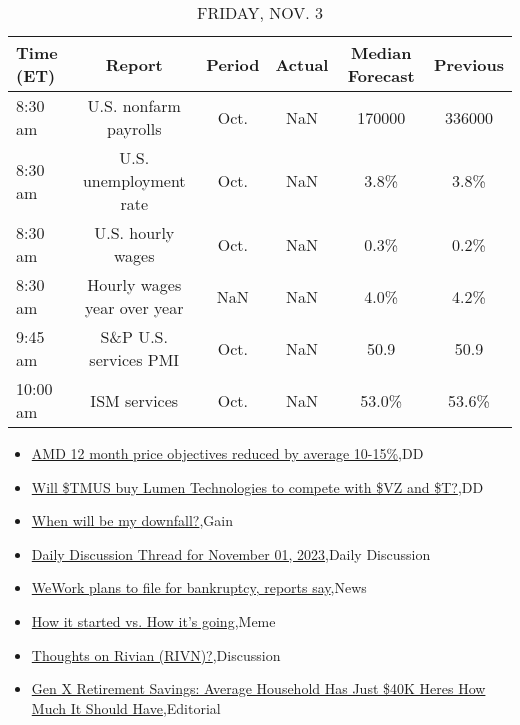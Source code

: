 \documentclass{article}%
\begin{document}
%


\begin{table}[htbp]%
\caption{FRIDAY, NOV. 3}%
\centering%
\begin{adjustbox}{width=1\textwidth}%
\begin{tabular}{lccccc}
\toprule
Time (ET) &                      Report & Period & Actual & Median Forecast & Previous \\
\midrule
  8:30 am &       U.S. nonfarm payrolls &   Oct. &    NaN &          170000 &   336000 \\
  8:30 am &      U.S. unemployment rate &   Oct. &    NaN &            3.8\% &     3.8\% \\
  8:30 am &           U.S. hourly wages &   Oct. &    NaN &            0.3\% &     0.2\% \\
  8:30 am & Hourly wages year over year &    NaN &    NaN &            4.0\% &     4.2\% \\
  9:45 am &       S\&P U.S. services PMI &   Oct. &    NaN &            50.9 &     50.9 \\
 10:00 am &                ISM services &   Oct. &    NaN &           53.0\% &    53.6\% \\
\bottomrule
\end{tabular}
%
\end{adjustbox}%
\end{table}

%
\begin{itemize}%
\item%
\href{https://reddit.com/r/wallstreetbets/comments/17lba3a/amd\_12\_month\_price\_objectives\_reduced\_by\_average/}{AMD 12 month price objectives reduced by average 10-15\%},DD%
\item%
\href{https://reddit.com/r/wallstreetbets/comments/17la1r1/will\_tmus\_buy\_lumen\_technologies\_to\_compete\_with/}{Will \$TMUS buy Lumen Technologies to compete with \$VZ and \$T?},DD%
\item%
\href{https://reddit.com/r/wallstreetbets/comments/17l9htl/when\_will\_be\_my\_downfall/}{When will be my downfall?},Gain%
\item%
\href{https://reddit.com/r/wallstreetbets/comments/17l8ny8/daily\_discussion\_thread\_for\_november\_01\_2023/}{Daily Discussion Thread for November 01, 2023},Daily Discussion%
\item%
\href{https://reddit.com/r/wallstreetbets/comments/17l6n4t/wework\_plans\_to\_file\_for\_bankruptcy\_reports\_say/}{WeWork plans to file for bankruptcy, reports say},News%
\item%
\href{https://reddit.com/r/wallstreetbets/comments/17l5qqe/how\_it\_started\_vs\_how\_its\_going/}{How it started vs. How it's going},Meme%
\item%
\href{https://reddit.com/r/StockMarket/comments/17kt86a/thoughts\_on\_rivian\_rivn/}{Thoughts on Rivian (RIVN)?},Discussion%
\item%
\href{https://reddit.com/r/Economics/comments/17l5kdz/gen\_x\_retirement\_savings\_average\_household\_has/}{Gen X Retirement Savings: Average Household Has Just \$40K  Heres How Much It Should Have},Editorial%
\end{itemize}%
\end{document}
